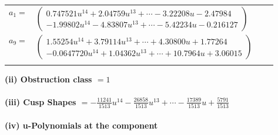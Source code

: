 \documentclass[1p]{elsarticle_modified}
\theoremstyle{definition}
\begin{document}
\begin{tabular}{m{7pt} m{180pt} m{7pt} m{180pt} }
\flushright $a_{1}=$&$\begin{pmatrix}0.747521 u^{14}+2.04759 u^{13}+\cdots-3.22208 u-2.47984\\-1.99802 u^{14}-4.83807 u^{13}+\cdots-5.42234 u-0.216127\end{pmatrix}$ \\
\flushright $a_{9}=$&$\begin{pmatrix}1.55254 u^{14}+3.79114 u^{13}+\cdots+4.30800 u+1.77264\\-0.0647720 u^{14}+1.04362 u^{13}+\cdots+10.7964 u+3.06015\end{pmatrix}$\\&\end{tabular}
\flushleft \textbf{(ii) Obstruction class $= 1$}\\~\\
\flushleft \textbf{(iii) Cusp Shapes $= -\frac{11241}{1513} u^{14}-\frac{26858}{1513} u^{13}+\cdots-\frac{17389}{1513} u+\frac{5791}{1513}$}\\~\\
\newpage\renewcommand{\arraystretch}{1}
\flushleft \textbf{(iv) u-Polynomials at the component}\newline \\
\end{document}

